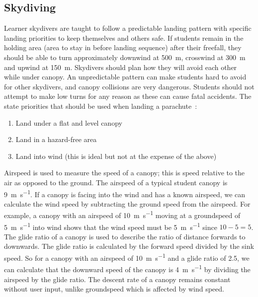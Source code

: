 \documentclass[11pt, a4paper, twocolumn]{article}
\begin{document}
\subsection{Skydiving}
Learner skydivers are taught to follow a predictable landing pattern with specific landing priorities to keep themselves and others safe. If students remain in the holding area (area to stay in before landing sequence) after their freefall, they should be able to turn approximately downwind at \SI{500}{\metre}, crosswind at \SI{300}{\metre} and upwind at \SI{150}{\metre}. Skydivers should plan how they will avoid each other while under canopy. An unpredictable pattern can make students hard to avoid for other skydivers, and canopy collisions are very dangerous. Students should not attempt to make low turns for any reason as these can cause fatal accidents. The \citeauthor{british_parachute_association_chmanual.pdf_????} state priorities that should be used when landing a parachute~\cite{british_parachute_association_chmanual.pdf_????}:

\begin{enumerate}
    \item Land under a flat and level canopy
    \item Land in a hazard-free area
    \item Land into wind (this is ideal but not at the expense of the above)
\end{enumerate}


Airspeed is used to measure the speed of a canopy; this is speed relative to the air as opposed to the ground. The airspeed of a typical student canopy is \SI{9}{\metre\per\second}. If a canopy is facing into the wind and has a known airspeed, we can calculate the wind speed by subtracting the ground speed from the airspeed. For example, a canopy with an airspeed of \SI{10}{\metre\per\second} moving at a groundspeed of \SI{5}{\metre\per\second} into wind shows that the wind speed must be \SI{5}{\metre\per\second} since $10 - 5 = 5$.
The glide ratio of a canopy is used to describe the ratio of distance forwards to downwards. The glide ratio is calculated by the forward speed divided by the sink speed. So for a canopy with an airspeed of \SI{10}{\metre\per\second} and a glide ratio of 2.5, we can calculate that the downward speed of the canopy is \SI{4}{\metre\per\second} by dividing the airspeed by the glide ratio. The descent rate of a canopy remains constant without user input, unlike groundspeed which is affected by wind speed.
\end{document}
